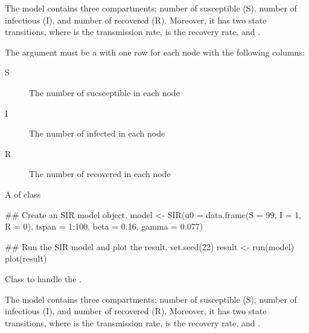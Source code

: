 \documentclass[letterpaper]{book}
\begin{document}
%
\begin{Details}
The  model contains three compartments; number of
susceptible (S), number of infectious (I), and number of
recovered (R).  Moreover, it has two state transitions,
where \eqn{\beta}{} is the transmission rate, \eqn{\gamma}{} is the
recovery rate, and .

The argument  must be a  with one row for
each node with the following columns:
\begin{description}

\item[S] The number of sucsceptible in each node
\item[I] The number of infected in each node
\item[R] The number of recovered in each node

\end{description}

\end{Details}
%
\begin{Value}
A  of class 
\end{Value}
%
\begin{Examples}
\begin{ExampleCode}
## Create an SIR model object.
model <- SIR(u0 = data.frame(S = 99, I = 1, R = 0),
             tspan = 1:100,
             beta = 0.16,
             gamma = 0.077)

## Run the SIR model and plot the result.
set.seed(22)
result <- run(model)
plot(result)
\end{ExampleCode}
\end{Examples}
%
\begin{Description}
Class to handle the  .
\end{Description}
%
\begin{Details}
The  model contains three compartments; number of
susceptible (S), number of infectious (I), and number of
recovered (R).  Moreover, it has two state transitions,
where \eqn{\beta}{} is the transmission rate, \eqn{\gamma}{} is the
recovery rate, and .
\end{Details}
\end{document}
